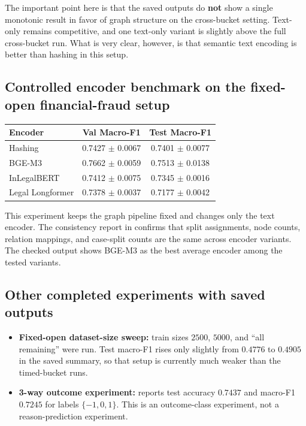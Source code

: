 \documentclass[12pt,a4paper]{article}
\begin{document}
The important point here is that the saved outputs do \textbf{not} show a single monotonic result in favor of graph structure on the cross-bucket setting. Text-only remains competitive, and one text-only variant is slightly above the full cross-bucket run. What is very clear, however, is that semantic text encoding is better than hashing in this setup.

\subsection*{Controlled encoder benchmark on the fixed-open financial-fraud setup}

\begin{center}
\small
\begin{tabular}{lcc}
\toprule
\textbf{Encoder} & \textbf{Val Macro-F1} & \textbf{Test Macro-F1} \\
\midrule
Hashing & 0.7427 \(\pm\) 0.0067 & 0.7401 \(\pm\) 0.0077 \\
BGE-M3 & 0.7662 \(\pm\) 0.0059 & 0.7513 \(\pm\) 0.0138 \\
InLegalBERT & 0.7412 \(\pm\) 0.0075 & 0.7345 \(\pm\) 0.0016 \\
Legal Longformer & 0.7378 \(\pm\) 0.0037 & 0.7177 \(\pm\) 0.0042 \\
\bottomrule
\end{tabular}
\end{center}

This experiment keeps the graph pipeline fixed and changes only the text encoder. The consistency report in  confirms that split assignments, node counts, relation mappings, and case-split counts are the same across encoder variants. The checked output shows BGE-M3 as the best average encoder among the tested variants.

\subsection*{Other completed experiments with saved outputs}

\begin{itemize}[noitemsep]
\item \textbf{Fixed-open dataset-size sweep:} train sizes \(2500\), \(5000\), and ``all remaining'' were run. Test macro-F1 rises only slightly from \(0.4776\) to \(0.4905\) in the saved summary, so that setup is currently much weaker than the timed-bucket runs.
\item \textbf{3-way outcome experiment:}  reports test accuracy \(0.7437\) and macro-F1 \(0.7245\) for labels \(\{-1, 0, 1\}\). This is an outcome-class experiment, not a reason-prediction experiment.
\end{itemize}
\end{document}
